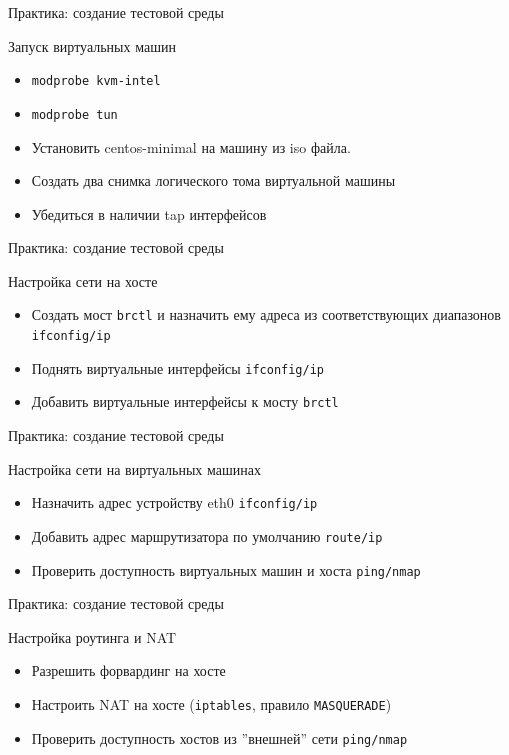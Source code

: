 \begin{frame}{Практика: создание тестовой среды}

	\begin{block}{Запуск виртуальных машин}

		\begin{itemize}
			\item {\tt modprobe kvm-intel} 
			\item {\tt modprobe tun}
			\item Установить centos-minimal на  машину из iso файла.
                        \item Создать два снимка логического тома виртуальной машины
			\item Убедиться в наличии tap интерфейсов
		\end{itemize}
	\end{block}

\end{frame}


\begin{frame}{Практика: создание тестовой среды}

	\begin{block}{Настройка сети на хосте}
			\begin{itemize}
				\item Создать мост {\tt brctl} и назначить ему адреса из соответствующих диапазонов {\tt ifconfig/ip}
				\item Поднять виртуальные интерфейсы {\tt ifconfig/ip}
				\item Добавить виртуальные интерфейсы к мосту {\tt brctl}
			\end{itemize}
	\end{block}
\end{frame}


\begin{frame}{Практика: создание тестовой среды}
	\begin{block}{Настройка сети на виртуальных машинах}
			\begin{itemize}
				\item Назначить адрес устройству eth0 {\tt ifconfig/ip}
				\item Добавить адрес маршрутизатора по умолчанию {\tt route/ip}
				\item Проверить доступность виртуальных машин и хоста {\tt ping/nmap}
			\end{itemize}
	\end{block}
\end{frame}

\begin{frame}{Практика: создание тестовой среды}

	\begin{block}{Настройка роутинга и NAT}
			\begin{itemize}
				\item Разрешить форвардинг на хосте
				\item Настроить NAT на хосте ({\tt iptables},  правило {\tt MASQUERADE})
				\item Проверить доступность хостов из ''внешней'' сети {\tt ping/nmap}
			\end{itemize}
	\end{block}
\end{frame}


